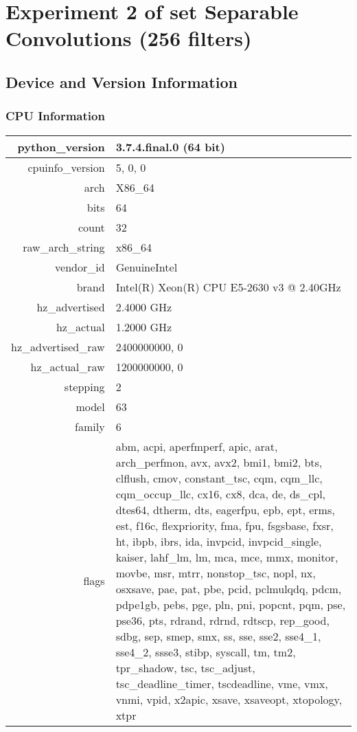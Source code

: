 \documentclass{article}%
\begin{document}
%
\normalsize%
\section{Experiment 2 of set Separable Convolutions (256 filters)}%
\label{sec:Experiment 2 of set Separable Convolutions (256 filters)}%
\subsection{Device and Version Information}%
\label{subsec:Device and Version Information}%
\subsubsection{CPU Information}%
\label{ssubsec:CPU Information}%
\begin{tabular}{|r|p{8cm}|}%
\hline%
python\_version&3.7.4.final.0 (64 bit)\\%
\hline%
cpuinfo\_version&5, 0, 0\\%
\hline%
arch&X86\_64\\%
\hline%
bits&64\\%
\hline%
count&32\\%
\hline%
raw\_arch\_string&x86\_64\\%
\hline%
vendor\_id&GenuineIntel\\%
\hline%
brand&Intel(R) Xeon(R) CPU E5{-}2630 v3 @ 2.40GHz\\%
\hline%
hz\_advertised&2.4000 GHz\\%
\hline%
hz\_actual&1.2000 GHz\\%
\hline%
hz\_advertised\_raw&2400000000, 0\\%
\hline%
hz\_actual\_raw&1200000000, 0\\%
\hline%
stepping&2\\%
\hline%
model&63\\%
\hline%
family&6\\%
\hline%
flags&abm, acpi, aperfmperf, apic, arat, arch\_perfmon, avx, avx2, bmi1, bmi2, bts, clflush, cmov, constant\_tsc, cqm, cqm\_llc, cqm\_occup\_llc, cx16, cx8, dca, de, ds\_cpl, dtes64, dtherm, dts, eagerfpu, epb, ept, erms, est, f16c, flexpriority, fma, fpu, fsgsbase, fxsr, ht, ibpb, ibrs, ida, invpcid, invpcid\_single, kaiser, lahf\_lm, lm, mca, mce, mmx, monitor, movbe, msr, mtrr, nonstop\_tsc, nopl, nx, osxsave, pae, pat, pbe, pcid, pclmulqdq, pdcm, pdpe1gb, pebs, pge, pln, pni, popcnt, pqm, pse, pse36, pts, rdrand, rdrnd, rdtscp, rep\_good, sdbg, sep, smep, smx, ss, sse, sse2, sse4\_1, sse4\_2, ssse3, stibp, syscall, tm, tm2, tpr\_shadow, tsc, tsc\_adjust, tsc\_deadline\_timer, tscdeadline, vme, vmx, vnmi, vpid, x2apic, xsave, xsaveopt, xtopology, xtpr\\%

\end{tabular}
\end{document}
